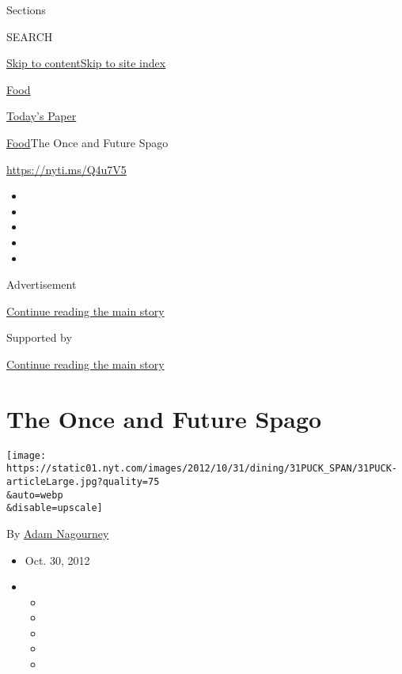 Sections

SEARCH

\protect\hyperlink{site-content}{Skip to
content}\protect\hyperlink{site-index}{Skip to site index}

\href{https://www.nytimes.com/section/food}{Food}

\href{https://myaccount.nytimes.com/auth/login?response_type=cookie\&client_id=vi}{}

\href{https://www.nytimes.com/section/todayspaper}{Today's Paper}

\href{/section/food}{Food}\textbar{}The Once and Future Spago

\url{https://nyti.ms/Q4u7V5}

\begin{itemize}
\item
\item
\item
\item
\item
\end{itemize}

Advertisement

\protect\hyperlink{after-top}{Continue reading the main story}

Supported by

\protect\hyperlink{after-sponsor}{Continue reading the main story}

\hypertarget{the-once-and-future-spago}{%
\section{The Once and Future Spago}\label{the-once-and-future-spago}}

\texttt{[image: https://static01.nyt.com/images/2012/10/31/dining/31PUCK\_SPAN/31PUCK-articleLarge.jpg?quality=75\\\&auto=webp\\\&disable=upscale]}

By \href{https://www.nytimes.com/by/adam-nagourney}{Adam Nagourney}

\begin{itemize}
\item
  Oct. 30, 2012
\item
  \begin{itemize}
  \item
  \item
  \item
  \item
  \item
  \end{itemize}
\end{itemize}

